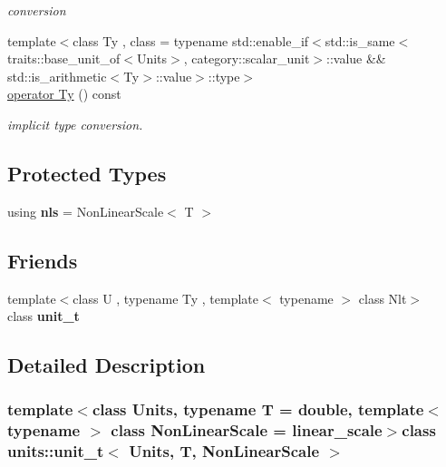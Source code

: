 \begin{DoxyCompactItemize}
\begin{DoxyCompactList}\small\item\em conversion \end{DoxyCompactList}\item 
{\footnotesize template$<$class Ty , class  = typename std\+::enable\+\_\+if$<$std\+::is\+\_\+same$<$traits\+::base\+\_\+unit\+\_\+of$<$\+Units$>$, category\+::scalar\+\_\+unit$>$\+::value \&\& std\+::is\+\_\+arithmetic$<$\+Ty$>$\+::value$>$\+::type$>$ }\\\hyperlink{classunits_1_1unit__t_a66df18f075362a72034f14056422af4c}{operator Ty} () const 
\begin{DoxyCompactList}\small\item\em implicit type conversion. \end{DoxyCompactList}\end{DoxyCompactItemize}
\subsection*{Protected Types}
\begin{DoxyCompactItemize}
\item 
\hypertarget{classunits_1_1unit__t_ade7926dca4829a3dab64ae3c2682b491}{}using {\bfseries nls} = Non\+Linear\+Scale$<$ T $>$\label{classunits_1_1unit__t_ade7926dca4829a3dab64ae3c2682b491}

\end{DoxyCompactItemize}
\subsection*{Friends}
\begin{DoxyCompactItemize}
\item 
\hypertarget{classunits_1_1unit__t_a8d70ccbc4f5e6c787ca26bdd69eb71f5}{}{\footnotesize template$<$class U , typename Ty , template$<$ typename $>$ class Nlt$>$ }\\class {\bfseries unit\+\_\+t}\label{classunits_1_1unit__t_a8d70ccbc4f5e6c787ca26bdd69eb71f5}

\end{DoxyCompactItemize}


\subsection{Detailed Description}
\subsubsection*{template$<$class Units, typename T = double, template$<$ typename $>$ class Non\+Linear\+Scale = linear\+\_\+scale$>$class units\+::unit\+\_\+t$<$ Units, T, Non\+Linear\+Scale $>$}

